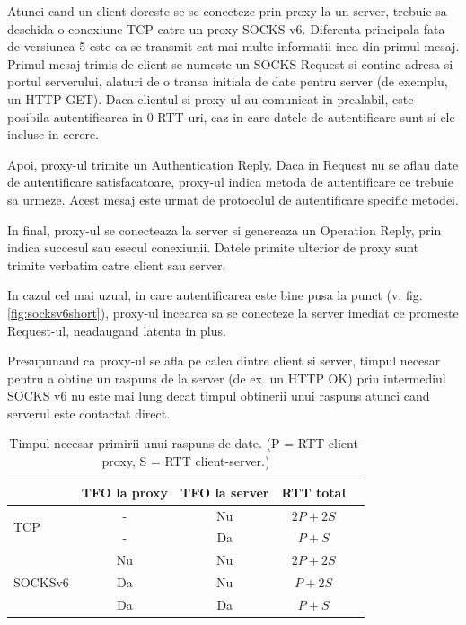 Atunci cand un client doreste se se conecteze prin proxy la un server, trebuie sa deschida o conexiune TCP
catre un proxy SOCKS v6. Diferenta principala fata de versiunea 5 este ca se transmit cat mai multe informatii
inca din primul mesaj. Primul mesaj trimis de client se numeste un SOCKS Request si  contine adresa si
portul serverului, alaturi de o transa initiala de date pentru server (de exemplu, un HTTP GET).
Daca clientul si proxy-ul au comunicat in prealabil, este posibila autentificarea in 0 RTT-uri, caz in care
datele de autentificare sunt si ele incluse in cerere.

Apoi, proxy-ul trimite un Authentication Reply. Daca in Request nu se aflau date de autentificare satisfacatoare,
proxy-ul indica metoda de autentificare ce trebuie sa urmeze. Acest mesaj este urmat de protocolul de autentificare 
specific metodei.

In final, proxy-ul se conecteaza la server si genereaza un Operation Reply, prin indica succesul sau esecul conexiunii.
Datele primite ulterior de proxy sunt trimite verbatim catre client sau server.

In cazul cel mai uzual, in care autentificarea este bine pusa la punct (v. fig. \ref{fig:socksv6short}), proxy-ul
incearca sa se conecteze la server imediat ce promeste Request-ul, neadaugand latenta in plus.

Presupunand ca proxy-ul se afla pe calea dintre client si server, timpul necesar pentru a obtine un raspuns de la server
(de ex. un HTTP OK) prin intermediul SOCKS v6 nu este mai lung decat timpul obtinerii unui raspuns atunci cand serverul
este contactat direct.

\begin{table}
	\centering
	\begin{tabular}{| l | c | c | c | r |} \hline
		& TFO la proxy & TFO la server & RTT total \\ \hline
		\multirow{2}{*}{TCP} & - & Nu  & \(2P+2S\) \\ \hhline{~----}
		~ & - & Da  & \(P+S\) \\ \hline
		\multirow{3}{*}{SOCKSv6} & Nu & Nu  & \(2P + 2S\)  \\ \hhline{~----}
		~ & Da & Nu & \(P + 2S\) \\ \hhline{~----}
		~ & Da  & Da & \(P + S\) \\ \hline
	\end{tabular}
  	\caption{Timpul necesar primirii unui raspuns de date. (P = RTT client-proxy, S = RTT client-server.)}
 \end{table}

